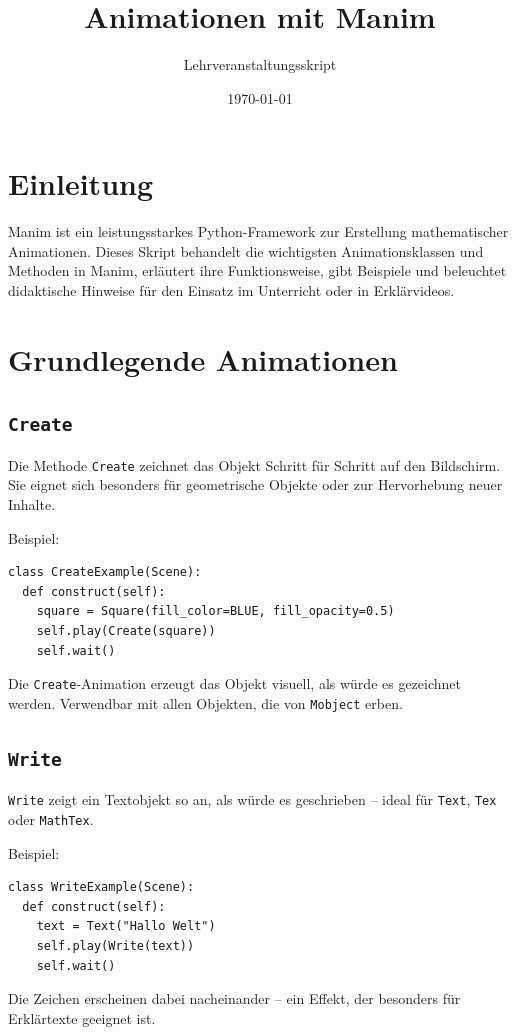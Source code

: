 \documentclass[12pt]{article}
\title{Animationen mit Manim}
\author{Lehrveranstaltungsskript}
\date{\today}
\begin{document}
\maketitle

\section*{Einleitung}
Manim ist ein leistungsstarkes Python-Framework zur Erstellung mathematischer Animationen. Dieses Skript behandelt die wichtigsten Animationsklassen und Methoden in Manim, erläutert ihre Funktionsweise, gibt Beispiele und beleuchtet didaktische Hinweise für den Einsatz im Unterricht oder in Erklärvideos.

\section{Grundlegende Animationen}

\subsection{\texttt{Create}}
Die Methode \texttt{Create} zeichnet das Objekt Schritt für Schritt auf den Bildschirm. Sie eignet sich besonders für geometrische Objekte oder zur Hervorhebung neuer Inhalte.

Beispiel:
\begin{verbatim}
class CreateExample(Scene):
  def construct(self):
    square = Square(fill_color=BLUE, fill_opacity=0.5)
    self.play(Create(square))
    self.wait()
\end{verbatim}

Die \texttt{Create}-Animation erzeugt das Objekt visuell, als würde es gezeichnet werden. Verwendbar mit allen Objekten, die von \texttt{Mobject} erben.

\subsection{\texttt{Write}}
\texttt{Write} zeigt ein Textobjekt so an, als würde es geschrieben – ideal für \texttt{Text}, \texttt{Tex} oder \texttt{MathTex}.

Beispiel:
\begin{verbatim}
class WriteExample(Scene):
  def construct(self):
    text = Text("Hallo Welt")
    self.play(Write(text))
    self.wait()
\end{verbatim}

Die Zeichen erscheinen dabei nacheinander – ein Effekt, der besonders für Erklärtexte geeignet ist.
\end{document}
